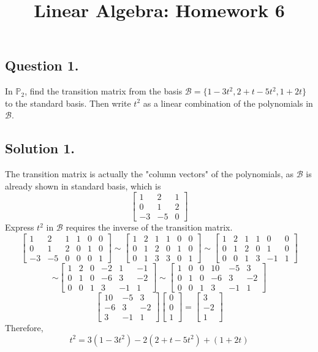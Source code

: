 \documentclass{article}
\title{Linear Algebra: Homework 6}
\begin{document}
\maketitle
\subsection*{Question 1.}
In $\mathbb{P}_2$, find the transition matrix from the basis $\mathcal{B}=\{1-3t^2,2+t-5t^2,1+2t\}$ to the standard basis. Then write $t^2$ as a linear combination of the polynomials in $\mathcal{B}$.
\subsection*{Solution 1.}
The transition matrix is actually the "column vectors" of the polynomials, as $\mathcal{B}$ is already shown in standard basis, which is
\[\left[\begin{array}{rrr}
1 & 2 & 1 \\
0 & 1 & 2  \\
-3 & -5 & 0 
\end{array}\right]\]
Express $t^2$ in $\mathcal{B}$ requires the inverse of the transition matrix.
\[\left[\begin{array}{rrrrrr}
1 & 2 & 1 & 1 &0 &0\\
0 & 1 & 2 & 0 & 1 & 0 \\
-3 & -5 & 0 & 0 & 0 & 1
\end{array}\right]
\sim
\left[\begin{array}{rrrrrr}
1 & 2 & 1 & 1 &0 &0\\
0 & 1 & 2 & 0 & 1 & 0 \\
0 & 1 & 3 & 3 & 0 & 1
\end{array}\right]
\sim
\left[\begin{array}{rrrrrr}
1 & 2 & 1 & 1 &0 &0\\
0 & 1 & 2 & 0 & 1 & 0 \\
0 & 0 & 1 & 3 & -1 & 1
\end{array}\right]
\]
\[
\sim
\left[\begin{array}{rrrrrr}
1 & 2 & 0 & -2 & 1 &-1\\
0 & 1 & 0 & -6 & 3 & -2 \\
0 & 0 & 1 & 3 & -1 & 1
\end{array}\right]
\sim
\left[\begin{array}{rrrrrr}
1 & 0 & 0 & 10 & -5 &3\\
0 & 1 & 0 & -6 & 3 & -2 \\
0 & 0 & 1 & 3 & -1 & 1
\end{array}\right]
\]
\[\left[\begin{array}{rrr}
10 & -5 &3\\
-6 & 3 & -2 \\
 3 & -1 & 1
\end{array}\right]\left[\begin{array}{r}0 \\ 0 \\ 1 \end{array}\right]=\left[\begin{array}{r}3 \\ -2 \\ 1 \end{array}\right]\]
Therefore, 
\[t^2=3(1-3t^2)-2(2+t-5t^2)+(1+2t)\]
\end{document}

